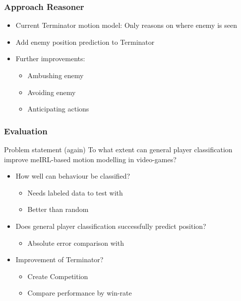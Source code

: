 \documentclass{beamer}
\begin{document}
        \begin{frame}
            \frametitle{Approach Reasoner}
            \begin{itemize}
                \item Current Terminator motion model:
                    Only reasons on where enemy is seen
                \item Add enemy position prediction to Terminator 
                \item Further improvements:
                    \begin{itemize}
                        \item Ambushing enemy
                        \item Avoiding enemy
                        \item Anticipating actions
                    \end{itemize}
            \end{itemize}
        \end{frame}

        \begin{frame}
            \frametitle{Evaluation}
            \begin{block}{Problem statement (again)}
                To what extent can general player classification improve meIRL-based motion modelling
                in video-games?
            \end{block}
            \begin{itemize}
                \item How well can behaviour be classified?
                    \begin{itemize}
                        \item Needs labeled data to test with
                        \item Better than random
                    \end{itemize}
                \item Does general player classification successfully predict position?
                    \begin{itemize}
                        \item Absolute error comparison with \citep{6374144}
                    \end{itemize}
                \item Improvement of Terminator?
                    \begin{itemize}
                        \item Create Competition
                        \item Compare performance by win-rate
                    \end{itemize}
            \end{itemize}
        \end{frame}
\end{document}
